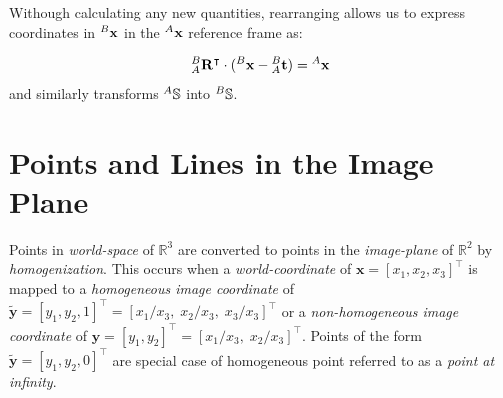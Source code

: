 \par Withough calculating any new quantities, rearranging allows us to express coordinates in ${^{B}\mathbf{x}}$ in the ${^{A}\mathbf{x}}$ reference frame as:

\par \begin{equation*}
	{\ensuremath{{^{B}_{A}}\mathbf{R}}\ensuremath{^{\intercal}}}\cdot ({^{B}\mathbf{x}} - {^{B}_{A}}\mathbf{t} ) = {^{A}\mathbf{x}}
\end{equation*}
and similarly transforms $^{A}\mathbb{S}$ into $^{B}\mathbb{S}$.

\section{Points and Lines in the Image Plane}

\par Points in \textit{world-space} of $\mathbb{R}^3$ are converted to points in the \textit{image-plane} of $\mathbb{R}^2$ by \textit{homogenization}. This occurs when a \textit{world-coordinate} of $\mathbf{x}=[x_1,x_2,x_3]^\intercal$ is mapped to a \textit{homogeneous image coordinate} of $\mathbf{\tilde{y}}=[y_1,y_2,1]^\intercal=[x_1/x_3,\;x_2/x_3,\;x_3/x_3]^\intercal$ or a \textit{non-homogeneous image coordinate} of $\mathbf{y}=[y_1,y_2]^\intercal=[x_1/x_3,\;x_2/x_3]^\intercal$. Points of the form $\mathbf{\tilde{y}}=[y_1,y_2,0]^\intercal$ are special case of homogeneous point referred to as a \textit{point at infinity}.

